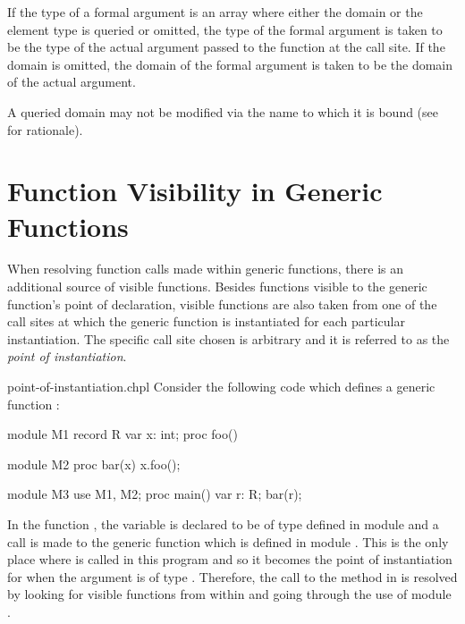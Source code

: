If the type of a formal argument is an array where either the domain
or the element type is queried or omitted, the type of the formal
argument is taken to be the type of the actual argument passed to the
function at the call site.  If the domain is omitted, the domain of
the formal argument is taken to be the domain of the actual argument.

A queried domain may not be modified via the name to which it is bound
(see~ for rationale).

\section{Function Visibility in Generic Functions}
\label{Function_Visibility_in_Generic_Functions}

When resolving function calls made within generic
functions, there is an additional source of visible functions. Besides
functions visible to the generic function's point of declaration,
visible functions are also taken from one of the call sites at which
the generic function is instantiated for each particular
instantiation.  The specific call site chosen is arbitrary and it is
referred to as the \emph{point of instantiation}.

\begin{chapelexample}{point-of-instantiation.chpl}
Consider the following code which defines a generic
function :
\begin{chapel}
module M1 {
  record R {
    var x: int;
    proc foo() { }
  }
}

module M2 {
  proc bar(x) {
    x.foo();
  }
}

module M3 {
  use M1, M2;
  proc main() {
    var r: R;
    bar(r);
  }
}
\end{chapel}
\begin{chapeloutput}
\end{chapeloutput}
In the function , the variable  is declared to be
of type  defined in module  and a call is made to the
generic function  which is defined in module .
This is the only place where  is called in this program and
so it becomes the point of instantiation for  when the
argument  is of type .  Therefore, the call to
the  method in  is resolved by looking for visible
functions from within  and going through the use of
module .
\end{chapelexample}

